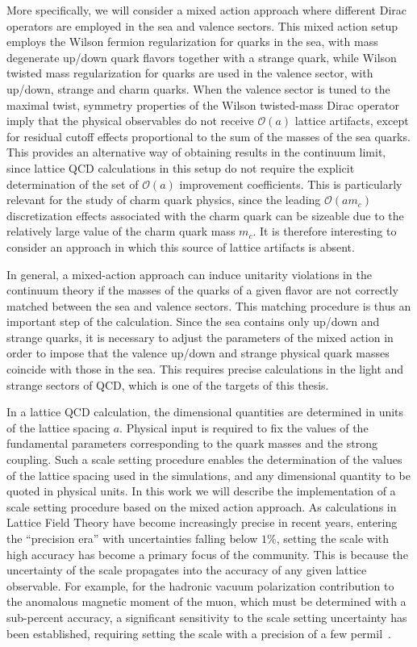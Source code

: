 More specifically, we will consider a mixed action approach where different Dirac operators are employed in the sea and valence sectors. This mixed action setup employs the Wilson fermion regularization for quarks in the sea, with mass degenerate up/down quark flavors together with a strange quark, while Wilson twisted mass regularization for quarks are used in the valence sector, with up/down, strange and charm quarks. When the valence sector is tuned to the maximal twist, symmetry properties of the Wilson twisted-mass Dirac operator imply that the physical observables do not receive $\mathcal{O}(a)$ lattice artifacts, except for residual cutoff effects proportional to the sum of the masses of the sea quarks.
This provides an alternative way of obtaining results in the continuum limit, since lattice QCD calculations in this setup do not require the explicit determination of the set of $\mathcal{O}(a)$ improvement coefficients. This is particularly relevant for the study of charm quark physics, since the leading $\mathcal{O}(am_c)$ discretization effects associated with the charm quark can be sizeable due to the relatively large value of the charm quark mass $m_c$.  It is therefore interesting to consider an approach in which this source of lattice artifacts is absent.

In general, a mixed-action approach can induce unitarity violations in the continuum theory if the masses of the quarks of a given flavor are not correctly matched between the sea and valence sectors. This matching procedure is thus an important step of the calculation. Since the sea contains only up/down and strange quarks, it is necessary to adjust the parameters of the mixed action in order to impose that the valence up/down and strange physical quark masses coincide with those in the sea. This requires precise calculations in the light and strange sectors of QCD, which is one of the targets of this thesis.

In a lattice QCD calculation, the dimensional quantities are determined in units of the lattice spacing $a$. Physical input is required to fix the values of the fundamental parameters corresponding to the quark masses and the strong coupling. Such a scale setting procedure enables the determination of the values of  the lattice spacing used in the simulations, and any dimensional quantity to be quoted in physical units. In this work we will describe the implementation of a scale setting procedure based on the mixed action approach. As calculations in Lattice Field Theory have become increasingly precise in recent years, entering the ``precision era'' with uncertainties falling below $1\%$, setting the scale with high accuracy has become a primary focus of the community. This is because the uncertainty of the scale propagates into the accuracy of any given lattice observable. For example, for the hadronic  vacuum polarization contribution to the anomalous magnetic moment of the muon, which must be determined with a sub-percent accuracy, a significant sensitivity to the scale setting uncertainty has been established, requiring setting the scale with a precision of a few permil~\citep{Borsanyi:2020mff}.

